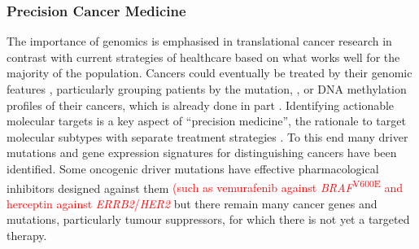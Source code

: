 \subsubsection{Precision Cancer Medicine}

The importance of genomics is emphasised in translational cancer research in contrast with current strategies of healthcare based on what works well for the majority of the population.
Cancers could eventually be treated by their genomic features \citep{Roychowdhury2016}, particularly grouping patients by the \gls{mutation}, , or \acrshort{DNA} methylation profiles of their cancers, which is already done in part \citep{Parker2009}. 
Identifying actionable molecular targets is a key aspect of ``\gls{precision medicine}'', the rationale to target \glspl{molecular subtype} with separate treatment strategies \citep{Glaire2017}. To this end many \glspl{driver mutation} and \gls{gene expression} signatures for distinguishing cancers have been identified. Some oncogenic \glspl{driver mutation} have effective pharmacological inhibitors designed against them \textcolor{red}{(such as vemurafenib against \textit{BRAF}\textsuperscript{V600E} and herceptin against \textit{ERRB2}/\textit{HER2}} but there remain many \glspl{cancer gene} and \glspl{mutation}, particularly \glspl{tumour suppressor}, for which there is not yet a \gls{targeted therapy}.

